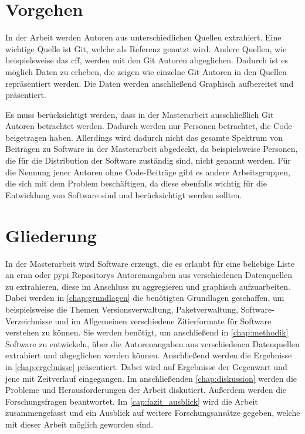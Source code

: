 \section{Vorgehen}
\label{sec:vorgehen}
In der Arbeit werden Autoren aus unterschiedlichen Quellen extrahiert.
Eine wichtige Quelle ist Git, welche als Referenz genutzt wird.
Andere Quellen, wie beispielsweise das \gls{cff}, werden mit den Git Autoren abgeglichen.
Dadurch ist es möglich Daten zu erheben, die zeigen wie einzelne Git Autoren in den Quellen repräsentiert werden.
Die Daten werden anschließend Graphisch aufbereitet und präsentiert.

Es muss berücksichtigt werden, dass in der Masterarbeit ausschließlich Git Autoren betrachtet werden.
Dadurch werden nur Personen betrachtet, die Code beigetragen haben.
Allerdings wird dadurch nicht das gesamte Spektrum von Beiträgen zu Software in der Masterarbeit abgedeckt, da beispielsweise Personen, die für die Distribution der Software zuständig sind, nicht genannt werden.
Für die Nennung jener Autoren ohne Code-Beiträge gibt es andere Arbeitsgruppen, die sich mit dem Problem beschäftigen, da diese ebenfalls wichtig für die Entwicklung von Software sind und berücksichtigt werden sollten.

\section{Gliederung}
\label{sec:gliederung}
In der Masterarbeit wird Software erzeugt, die es erlaubt für eine beliebige Liste an \gls{cran} oder \gls{pypi} Repositorys Autorenangaben aus verschiedenen Datenquellen zu extrahieren, diese im Anschluss zu aggregieren und graphisch aufzuarbeiten.
Dabei werden in \autoref{chap:grundlagen} die benötigten Grundlagen geschaffen, um beispielsweise die Themen Versionsverwaltung, Paketverwaltung, Software-Verzeichnisse und im Allgemeinen verschiedene Zitierformate für Software verstehen zu können.
Sie werden benötigt, um anschließend in \autoref{chap:methodik} Software zu entwickeln, über die Autorenangaben aus verschiedenen Datenquellen extrahiert und abgeglichen werden können.
Anschließend werden die Ergebnisse in \autoref{chap:ergebnisse} präsentiert.
Dabei wird auf Ergebnisse der Gegenwart und jene mit Zeitverlauf eingegangen.
Im anschließenden \autoref{chap:diskussion} werden die Probleme und Herausforderungen der Arbeit diskutiert.
Außerdem werden die Forschungsfragen beantwortet.
Im \autoref{cap:fazit_ausblick} wird die Arbeit zusammengefasst und ein Ausblick auf weitere Forschungsansätze gegeben, welche mit dieser Arbeit möglich geworden sind.
